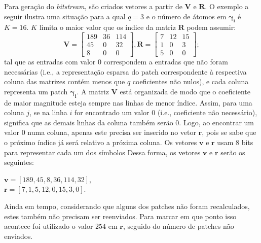 \documentclass[cic,tc]{iiufrgs}
\renewcommand{\vec}[1]{\bm{#1}}
\newcommand{\mat}[1]{\bm{#1}}
\begin{document}
Para geração do \textit{bitstream}, são criados vetores a partir de $\mat{V}$ e $\mat{R}$.
O exemplo a seguir ilustra uma situação para a qual $q = 3$ e o número de átomos em 
$\vec{\gamma_i}$ é $K = 16$. 
$K$ limita o maior valor que os índice da matriz $\mat{R}$ podem assumir:
\begin{equation*}
    \mat{V} = 
    \begin{bmatrix}
        189 & 36 & 114 \\
        45  & 0 & 32  \\
        8   & 0 & 0
    \end{bmatrix},
    \mat{R} = 
    \begin{bmatrix}
        7 & 12 & 15 \\
        1  & 0 & 3  \\
        5   & 0 & 0
    \end{bmatrix};      
\end{equation*}
tal que as entradas com valor $0$ correspondem a entradas que não foram necessárias 
(i.e., a representação esparsa do patch correspondente à respectiva coluna das matrizes 
contém menos que $q$ coeficientes não nulos),
e cada coluna representa um patch $\vec{\gamma_i}$.
A matriz $\mat{V}$ está organizada de modo que o coeficiente de maior magnitude
esteja sempre nas linhas de menor índice. 
Assim, para uma coluna $j$, se na linha $i$ for encontrado um valor $0$ (i.e., coeficiente não necessário),
significa que as demais linhas da coluna também serão $0$.
Logo, ao encontrar um valor $0$ numa coluna, apenas este precisa ser inserido no vetor $\vec{r}$, 
pois se sabe que o próximo índice já será relativo a próxima coluna.  
Os vetores $\vec{v}$ e $\vec{r}$ usam 8 bits para representar cada um dos símbolos
Dessa forma, os vetores $\vec{v}$ e $\vec{r}$ serão os seguintes: 
\begin{center}
    $\vec{v} = \left[ 189, 45, 8, 36, 114, 32 \right]$, \\
    $\vec{r} = \left[ 7,1,5,12,0,15,3,0 \right]$.
\end{center}

Ainda em tempo, considerando que alguns dos patches não foram recalculados, estes 
também não precisam ser reenviados. 
Para marcar em que ponto isso acontece foi utilizado o valor $254$ em $\vec{r}$, 
seguido do número de patches não enviados.
\end{document}
